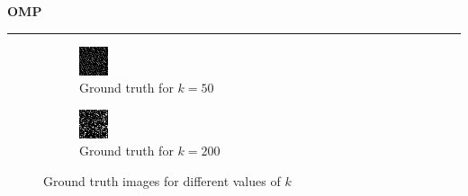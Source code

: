 \documentclass[a4paper,12pt]{article}
\newenvironment{solution}[2][]{%
    \begin{mdframed}[linecolor=blue!70!black, linewidth=2pt, roundcorner=10pt, backgroundcolor=yellow!10!white, skipabove=12pt, skipbelow=12pt]%
        \textbf{\large #2}
        \par\noindent\rule{\textwidth}{0.4pt}
}{
    \end{mdframed}
}
\begin{document}
\begin{solution}{OMP}
\begin{figure}[H]
\begin{subfigure}[t]{0.32\textwidth}
      \includegraphics[width=\textwidth]{../images/omp/Ground_truth_k_50.png}
      \caption{Ground truth for $k = 50$}
  \end{subfigure}
  \begin{subfigure}[t]{0.32\textwidth}
      \centering
      \includegraphics[width=\textwidth]{../images/omp/Ground_truth_k_200.png}
      \caption{Ground truth for $k = 200$}
  \end{subfigure}
  \caption{Ground truth images for different values of $k$}
  \label{fig:ground_truth}
\end{figure}


\end{solution}
\end{document}
